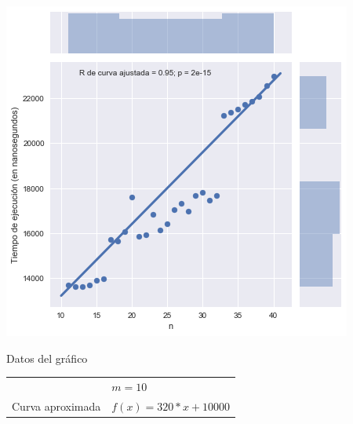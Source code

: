 \noindent
\begin{minipage}{0.49\textwidth}
    \hfill
    \includegraphics[scale=0.55]{img/greedy-n-low.png}

    \begin{center}
        Datos del gráfico

        \begin{tabular}{ | l l |}
            \hline
             & $m = 10$ \\ 
            Curva aproximada & $f(x) = 320 * x + 10000$ \\
            \hline
        \end{tabular}
    \end{center}
\end{minipage}
\hfill
